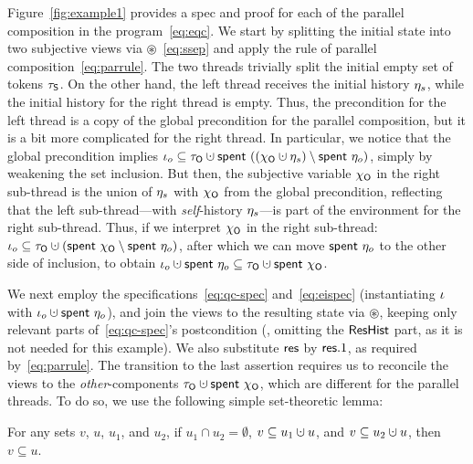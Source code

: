 Figure~\ref{fig:example1} provides a spec and proof for each of
the parallel composition in the program~\eqref{eq:eqc}.
%
%
We start by splitting the initial state into two subjective views via
$\circledast$~\eqref{eq:ssep} and apply the rule of parallel
composition~\eqref{eq:parrule}. The two threads trivially split the
initial empty set of tokens $\tau_{\mathsf{S}}$. On the other hand, the left
thread receives the initial history $\eta_s$, while the initial
history for the right thread is empty. Thus, the precondition for the
left thread is a copy of the global precondition for the parallel
composition, but it is a bit more complicated for the right thread.
%
In particular, we notice that the global precondition implies
$\ikno \subseteq \tkno \hunion \Tomb~((\histo \hunion \gists)
\setminus \Tomb~\gisto)$,
simply by weakening the set inclusion. But then, the subjective
variable $\chi_{\mathsf{O}}$ in the right sub-thread is the union of $\eta_s$
with $\chi_{\mathsf{O}}$ from the global precondition, reflecting that the left
sub-thread---with \emph{self}-history $\eta_s$---is part of the
environment for the right sub-thread. Thus, if we interpret $\chi_{\mathsf{O}}$
in the right sub-thread:
$\ikno \subseteq \tkno \hunion (\Tomb~\histo \setminus \Tomb~\gisto)$,
after which we can move $\mathsf{spent}~\eta_o$ to the other side of inclusion,
to obtain
$\ikno \hunion \Tomb~\gisto \subseteq \tkno \hunion \Tomb~\histo$. 
%

%

%
We next employ the specifications~\eqref{eq:qc-spec}
and~\eqref{eq:eispec} (instantiating $\iota$ with $\ikno \hunion
\Tomb~\gisto$), and join the views to the resulting state via
$\circledast$, keeping only relevant parts of~\eqref{eq:qc-spec}'s
postcondition (\ie, omitting the $\mathsf{ResHist}$ part, as it is not needed
for this example). We also substitute $\mathsf{res}$ by $\mathsf{res}.1$, as required
by~\eqref{eq:parrule}.
%
The transition to the last assertion requires us to reconcile the
views to the \emph{other}-components $\tkno \hunion \Tomb~\histo$,
which are different for the parallel threads. To do so, we use the
following simple set-theoretic lemma:

\vspace{3pt}
\begin{lemma}
\label{lm:cheb}
For any sets $v$, $u$, $u_1$, and $u_2$, if
$u_1 \cap u_2 = \emptyset$, $v \subseteq u_1 \hunion u$, and
$v \subseteq u_2 \hunion u$, then $v \subseteq u$.
\end{lemma}
\vspace{3pt}
%
\noindent
%

